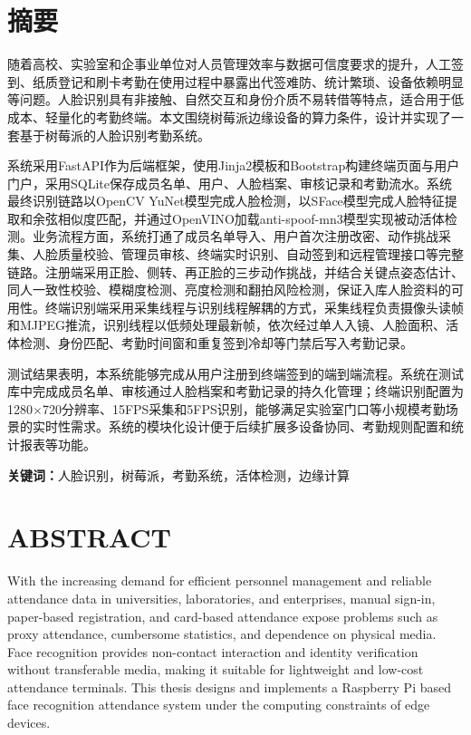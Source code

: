 \documentclass{heuthesis}
\begin{document}
\makeCover

\cleardoublepage
\section*{\centering{}摘\quad 要}

随着高校、实验室和企事业单位对人员管理效率与数据可信度要求的提升，人工签到、纸质登记和刷卡考勤在使用过程中暴露出代签难防、统计繁琐、设备依赖明显等问题。人脸识别具有非接触、自然交互和身份介质不易转借等特点，适合用于低成本、轻量化的考勤终端。本文围绕树莓派边缘设备的算力条件，设计并实现了一套基于树莓派的人脸识别考勤系统。

系统采用FastAPI作为后端框架，使用Jinja2模板和Bootstrap构建终端页面与用户门户，采用SQLite保存成员名单、用户、人脸档案、审核记录和考勤流水。系统最终识别链路以OpenCV YuNet模型完成人脸检测，以SFace模型完成人脸特征提取和余弦相似度匹配，并通过OpenVINO加载anti-spoof-mn3模型实现被动活体检测。业务流程方面，系统打通了成员名单导入、用户首次注册改密、动作挑战采集、人脸质量校验、管理员审核、终端实时识别、自动签到和远程管理接口等完整链路。注册端采用正脸、侧转、再正脸的三步动作挑战，并结合关键点姿态估计、同人一致性校验、模糊度检测、亮度检测和翻拍风险检测，保证入库人脸资料的可用性。终端识别端采用采集线程与识别线程解耦的方式，采集线程负责摄像头读帧和MJPEG推流，识别线程以低频处理最新帧，依次经过单人入镜、人脸面积、活体检测、身份匹配、考勤时间窗和重复签到冷却等门禁后写入考勤记录。

测试结果表明，本系统能够完成从用户注册到终端签到的端到端流程。系统在测试库中完成成员名单、审核通过人脸档案和考勤记录的持久化管理；终端识别配置为1280$\times$720分辨率、15FPS采集和5FPS识别，能够满足实验室门口等小规模考勤场景的实时性需求。系统的模块化设计便于后续扩展多设备协同、考勤规则配置和统计报表等功能。

\medskip
\noindent\textbf{关键词：}人脸识别，树莓派，考勤系统，活体检测，边缘计算

\cleardoublepage
\section*{\centering{}ABSTRACT}

With the increasing demand for efficient personnel management and reliable attendance data in universities, laboratories, and enterprises, manual sign-in, paper-based registration, and card-based attendance expose problems such as proxy attendance, cumbersome statistics, and dependence on physical media. Face recognition provides non-contact interaction and identity verification without transferable media, making it suitable for lightweight and low-cost attendance terminals. This thesis designs and implements a Raspberry Pi based face recognition attendance system under the computing constraints of edge devices.
\end{document}
